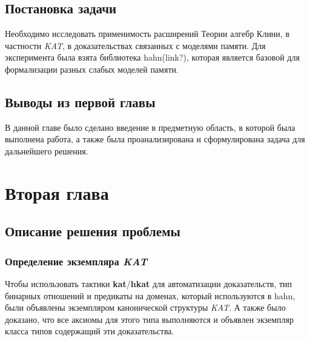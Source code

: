 \documentclass[times
              ]{itmo-student-thesis}
\begin{document}
  \section{Постановка задачи}
    Необходимо исследовать применимость расширений Теории алгебр Клини, в частности \textit{KAT}, в доказательствах связанных с моделями памяти.
    Для эксперимента была взята библиотека hahn(link?), которая является базовой для формализации разных слабых моделей памяти.

  \section{Выводы из первой главы}
    В данной главе было сделано введение в предметную область, в которой была выполнена работа,
    а также была проанализирована и сформулирована задача для дальнейшего решения.
\chapter{Вторая глава}

  \section{Описание решения проблемы}

    \subsection{Определение экземпляра \textit{KAT}}
    Чтобы использовать тактики \textbf{kat}/\textbf{hkat} для автоматизации доказательств,
    тип бинарных отношений и предикаты на доменах, который используются в hahn, были объявлены экземпляром канонической структуры \textit{KAT}.
    А также было доказано, что все аксиомы для этого типа выполняются и объявлен экземпляр класса типов содержащий эти доказательства.
\end{document}
